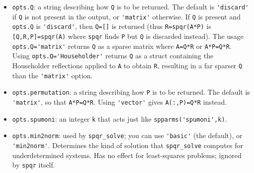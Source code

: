 \documentclass[12pt]{article}
\begin{document}
\begin{itemize}
       {\tt 'bestamd'}: try AMD and COLAMD and take the best.

       {\tt 'fixed'}: use \verb"P=I"; this is the only option if
       \verb"P" is not present in the output.

       {\tt 'natural'}: singleton removal only.

    \item \verb'opts.Q': a string describing how \verb'Q' is to be returned.
    The default is \verb"'discard'" if \verb'Q' is not present in the output,
    or \verb"'matrix'" otherwise.  If \verb'Q' is present and \verb'opts.Q' is
    \verb"'discard'", then \verb"Q=[]" is returned (thus \verb"R=spqr(A*P)" is
    \verb"[Q,R,P]=spqr(A)" where \verb"spqr" finds \verb"P" but \verb"Q" is
    discarded instead). The usage \verb"opts.Q='matrix'" returns \verb'Q' as a
    sparse matrix where \verb'A=Q*R' or \verb"A*P=Q*R".  Using
    \verb"opts.Q='Householder'" returns \verb'Q' as a struct containing the
    Householder reflections applied to \verb'A' to obtain \verb'R', resulting
    in a far sparser \verb'Q' than the \verb"'matrix'" option.  

    \item \verb'opts.permutation': a string describing how \verb'P' is to be
    returned.  The default is \verb"'matrix'", so that \verb"A*P=Q*R".  Using
    \verb"'vector'" gives \verb"A(:,P)=Q*R" instead.

    \item \verb'opts.spumoni': an integer \verb'k' that
        acts just like \verb"spparms('spumoni',k)".

    \item \verb'opts.min2norm': used by \verb'spqr_solve'; you can use
    \verb"'basic'" (the default), or \verb"'min2norm'".  Determines the kind of
    solution that \verb'spqr_solve' computes for underdetermined systems.  Has
    no effect for least-squares problems; ignored by \verb'spqr' itself.


\end{itemize}
\end{document}
